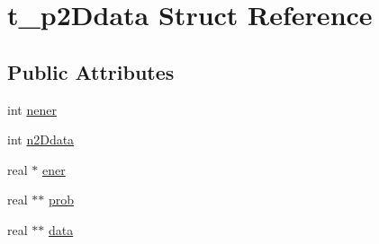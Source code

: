 \hypertarget{structt__p2Ddata}{\section{t\-\_\-p2\-Ddata \-Struct \-Reference}
\label{structt__p2Ddata}
}
\subsection*{\-Public \-Attributes}
\begin{DoxyCompactItemize}
\item 
int \hyperlink{structt__p2Ddata_abaf7ca6bbd616815168c296c630b0448}{nener}
\item 
int \hyperlink{structt__p2Ddata_a36f4f0bed9d652c411a4469c95253b6f}{n2\-Ddata}
\item 
real $\ast$ \hyperlink{structt__p2Ddata_a0a58b28aa3a418cbf1035464e5ca567c}{ener}
\item 
real $\ast$$\ast$ \hyperlink{structt__p2Ddata_a07c49cd72a36afcf2f12cffc8935e27f}{prob}
\item 
real $\ast$$\ast$ \hyperlink{structt__p2Ddata_a83103e01f406c050539612865259ce9a}{data}
\end{DoxyCompactItemize}


